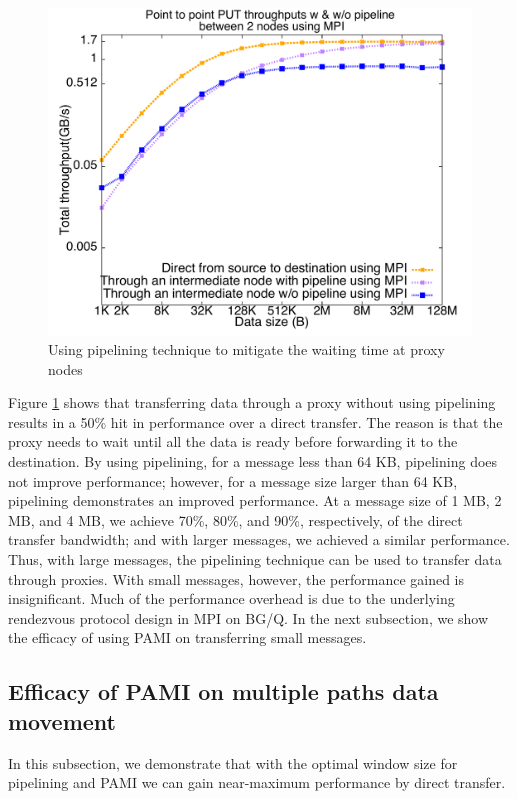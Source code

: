\documentclass[final,5p,times]{elsarticle}
\begin{document}
\begin{figure}[!htb]
\centering
\includegraphics[scale=0.3]{pipeline_mpi.pdf}
\caption{Using pipelining technique to mitigate the waiting time at proxy nodes}
\label{fig:pipeline_mpi}
\end{figure}

Figure \ref{fig:pipeline_mpi} shows that transferring data through a proxy without using pipelining results in a 50\% hit in performance over a direct transfer. The reason is that the proxy needs to wait until all the data is ready before forwarding it to the destination. By using pipelining, for a message less than 64 KB,  pipelining does not improve performance; however, for a message size larger than 64 KB, pipelining demonstrates an improved performance. At a  message size of 1 MB, 2 MB, and 4 MB, we achieve 70\%, 80\%, and  90\%, respectively, of the direct transfer bandwidth; and with larger messages, we achieved a similar performance. Thus, with large messages, the pipelining technique can be used to transfer data through proxies. With small messages, however, the performance gained is insignificant. Much of the performance overhead is due to the underlying rendezvous protocol design in MPI on BG/Q. 
In the next subsection, we show the efficacy of using PAMI on transferring small messages.

\subsection{Efficacy of PAMI on multiple paths data movement}
In this subsection, we demonstrate that with the optimal window size for pipelining and PAMI we can gain near-maximum performance by direct transfer.
\end{document}
